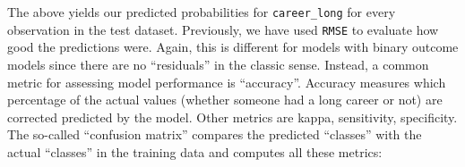 \documentclass[
]{book}
\newenvironment{Shaded}{\begin{snugshade}}{\end{snugshade}}
\newcommand{\AttributeTok}[1]{\textcolor[rgb]{0.13,0.29,0.53}{#1}}
\newcommand{\CommentTok}[1]{\textcolor[rgb]{0.56,0.35,0.01}{\textit{#1}}}
\newcommand{\ConstantTok}[1]{\textcolor[rgb]{0.56,0.35,0.01}{#1}}
\newcommand{\DecValTok}[1]{\textcolor[rgb]{0.00,0.00,0.81}{#1}}
\newcommand{\FloatTok}[1]{\textcolor[rgb]{0.00,0.00,0.81}{#1}}
\newcommand{\FunctionTok}[1]{\textcolor[rgb]{0.13,0.29,0.53}{\textbf{#1}}}
\newcommand{\NormalTok}[1]{#1}
\newcommand{\OtherTok}[1]{\textcolor[rgb]{0.56,0.35,0.01}{#1}}
\newcommand{\SpecialCharTok}[1]{\textcolor[rgb]{0.81,0.36,0.00}{\textbf{#1}}}
\newcommand{\StringTok}[1]{\textcolor[rgb]{0.31,0.60,0.02}{#1}}
\begin{document}
\begin{Shaded}
\end{Shaded}

The above yields our predicted probabilities for \texttt{career\_long} for every observation in the test dataset. Previously, we have used \texttt{RMSE} to evaluate how good the predictions were. Again, this is different for models with binary outcome models since there are no ``residuals'' in the classic sense.
Instead, a common metric for assessing model performance is ``accuracy''. Accuracy measures which percentage of the actual values (whether someone had a long career or not) are corrected predicted by the model. Other metrics are kappa, sensitivity, specificity. The so-called ``confusion matrix'' compares the predicted ``classes'' with the actual ``classes'' in the training data and computes all these metrics:
\end{document}
